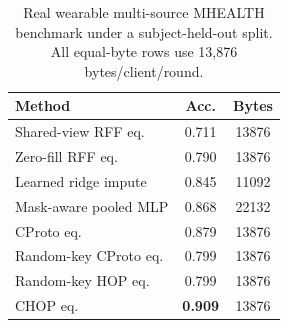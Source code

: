 \begin{table}[t]
\centering
\caption{Real wearable multi-source MHEALTH benchmark under a subject-held-out split. All equal-byte rows use 13,876 bytes/client/round.}
\label{tab:if-mhealth-compact}
\scriptsize
\setlength{\tabcolsep}{3pt}
\renewcommand{\arraystretch}{0.94}
\begin{tabular}{lcc}
\toprule
Method & Acc. & Bytes \\
\midrule
Shared-view RFF eq. & 0.711 & 13876 \\
Zero-fill RFF eq. & 0.790 & 13876 \\
Learned ridge impute & 0.845 & 11092 \\
Mask-aware pooled MLP & 0.868 & 22132 \\
CProto eq. & 0.879 & 13876 \\
Random-key CProto eq. & 0.799 & 13876 \\
Random-key HOP eq. & 0.799 & 13876 \\
CHOP eq. & \textbf{0.909} & 13876 \\
\bottomrule
\end{tabular}
\end{table}
